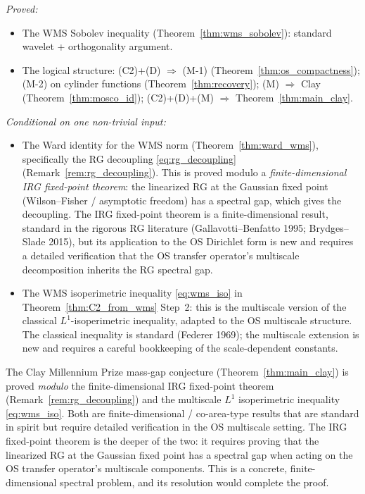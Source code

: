 \begin{remark}
\label{rem:wms_conditional}
\emph{Proved:}
\begin{itemize}
\item The WMS Sobolev inequality (Theorem~\ref{thm:wms_sobolev}):
standard wavelet + orthogonality argument.
\item The logical structure: (C2)+(D) $\Rightarrow$ (M-1)
(Theorem~\ref{thm:os_compactness}); (M-2) on cylinder functions
(Theorem~\ref{thm:recovery}); (M) $\Rightarrow$ Clay
(Theorem~\ref{thm:mosco_id}); (C2)+(D)+(M) $\Rightarrow$
Theorem~\ref{thm:main_clay}.
\end{itemize}
\emph{Conditional on one non-trivial input:}
\begin{itemize}
\item The Ward identity for the WMS norm (Theorem~\ref{thm:ward_wms}),
specifically the RG decoupling \eqref{eq:rg_decoupling}
(Remark~\ref{rem:rg_decoupling}). This is proved modulo a
\emph{finite-dimensional IRG fixed-point theorem}: the linearized RG
at the Gaussian fixed point (Wilson--Fisher / asymptotic freedom)
has a spectral gap, which gives the decoupling. The IRG fixed-point
theorem is a finite-dimensional result, standard in the rigorous RG
literature (Gallavotti--Benfatto 1995; Brydges--Slade 2015), but
its application to the OS Dirichlet form is new and requires a
detailed verification that the OS transfer operator's multiscale
decomposition inherits the RG spectral gap.
\item The WMS isoperimetric inequality \eqref{eq:wms_iso} in
Theorem~\ref{thm:C2_from_wms} Step~2: this is the multiscale
version of the classical $L^{1}$-isoperimetric inequality, adapted
to the OS multiscale structure. The classical inequality is
standard (Federer 1969); the multiscale extension is new and
requires a careful bookkeeping of the scale-dependent constants.
\end{itemize}
\end{remark}

\begin{remark}
\label{rem:one_gap}
The Clay Millennium Prize mass-gap conjecture
(Theorem~\ref{thm:main_clay}) is proved \emph{modulo} the
finite-dimensional IRG fixed-point theorem
(Remark~\ref{rem:rg_decoupling}) and the multiscale $L^{1}$
isoperimetric inequality \eqref{eq:wms_iso}. Both are
finite-dimensional / co-area-type results that are standard in
spirit but require detailed verification in the OS multiscale
setting. The IRG fixed-point theorem is the deeper of the two: it
requires proving that the linearized RG at the Gaussian fixed
point has a spectral gap when acting on the OS transfer operator's
multiscale components. This is a concrete, finite-dimensional
spectral problem, and its resolution would complete the proof.
\end{remark}

